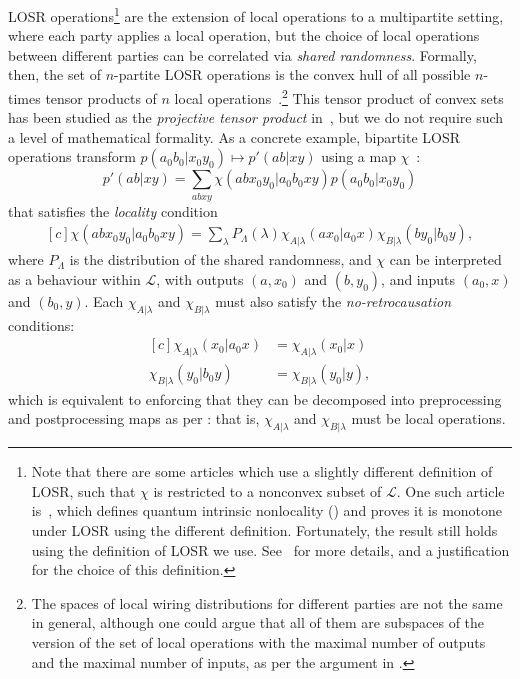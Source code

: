 \documentclass[10pt, a4paper]{article}
\numberwithin{equation}{section} %
\theoremstyle{definition}
\theoremstyle{plain}
\newcommand{\?}{\mathrel{?}} %
\newcommand{\Ls}{\mathcal{L}}
\begin{document}
              LOSR operations\footnote{Note that there are some articles which use a slightly different definition of LOSR, such that \(\chi\) is restricted to a nonconvex subset of \(\Ls\). One such article is~\cite{DIQKD_Limits}, which defines quantum intrinsic nonlocality () and proves it is monotone under LOSR using the different definition. Fortunately, the result still holds using the definition of LOSR we use. See~\cite[Sec A.2]{NonclassicalCausation} for more details, and a justification for the choice of this definition.} are the extension of local operations to a multipartite setting, where each party applies a local operation, but the choice of local operations between different parties can be correlated via \emph{shared randomness}. Formally, then, the set of \(n\)-partite LOSR operations is the convex hull of all possible \(n\)-times tensor products of \(n\) local operations~\cite{LocalTransformations}.\footnote{The spaces of local wiring distributions for different parties are not the same in general, although one could argue that all of them are subspaces of the version of the set of local operations with the maximal number of outputs and the maximal number of inputs, as per the argument in .} This tensor product of convex sets has been studied as the \emph{projective tensor product} in~\cite{AliceBobBanach}, but we do not require such a level of mathematical formality. As a concrete example, bipartite LOSR operations transform \(p(a_0 b_0|x_0 y_0) \mapsto p'(ab|xy)\) using a map \(\chi\)~\cite{NonclassicalCausation}:
              \begin{equation}
                p'(ab|xy) = \sum_{abxy} \chi(abx_0y_0|a_0b_0xy) p(a_0b_0|x_0y_0)
              \end{equation}
              that satisfies the \emph{locality} condition
              \begin{equation}
                \begin{aligned}[c]
                  \chi(abx_0y_0|a_0b_0xy) = \sum_{\lambda} P_{\Lambda}(\lambda) \chi_{A|\lambda}(ax_0|a_0x) \chi_{B|\lambda}(by_0|b_0y),
                \end{aligned}
              \end{equation}
              where \(P_{\Lambda}\) is the distribution of the shared randomness, and \(\chi\) can be interpreted as a behaviour within \(\Ls\), with outputs \((a, x_0)\) and \((b, y_0)\), and inputs \((a_0, x)\) and \((b_0, y)\). Each \(\chi_{A|\lambda}\) and \(\chi_{B|\lambda}\) must also satisfy the \emph{no-retrocausation} conditions:
              \begin{equation}
                \begin{aligned}[c]
                  \chi_{A|\lambda}(x_0|a_0x) &= \chi_{A|\lambda}(x_0|x) \\
                  \chi_{B|\lambda}(y_0|b_0y) &= \chi_{B|\lambda}(y_0|y),
                \end{aligned}
              \end{equation}
              which is equivalent to enforcing that they can be decomposed into preprocessing and postprocessing maps as per : that is, \(\chi_{A|\lambda}\) and \(\chi_{B|\lambda}\) must be local operations.
\end{document}
